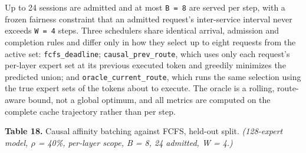 \documentclass[
  10pt,
  letterpaper,
  10pt]{article}
\begin{document}
Up to 24 sessions are admitted and at most \texttt{B\ =\ 8} are served
per step, with a frozen fairness constraint that an admitted request's
inter-service interval never exceeds \texttt{W\ =\ 4} steps. Three
schedulers share identical arrival, admission and completion rules and
differ only in how they select up to eight requests from the active set:
\texttt{fcfs\_deadline}; \texttt{causal\_prev\_route}, which uses only
each request's per-layer expert set at its previous executed token and
greedily minimizes the predicted union; and
\texttt{oracle\_current\_route}, which runs the same selection using the
true expert sets of the tokens about to execute. The oracle is a
rolling, route-aware bound, not a global optimum, and all metrics are
computed on the complete cache trajectory rather than per step.

\textbf{Table 18.} Causal affinity batching against FCFS, held-out
split. \emph{(128-expert model, \(\rho\) = 40\%, per-layer scope, B = 8,
24 admitted, W = 4.)}
\end{document}
